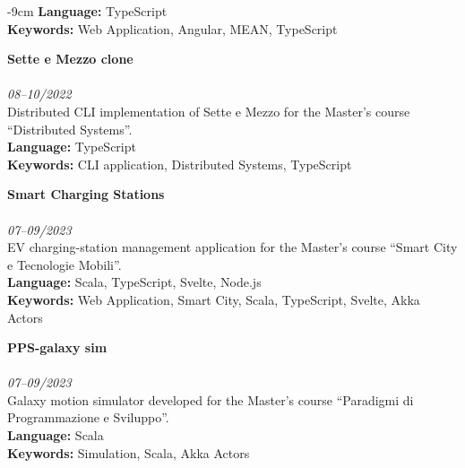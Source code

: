 \documentclass[10pt,a4paper]{altacv}
\begin{document}
\begin{adjustwidth}{}{-9cm}
    \textbf{Language:} TypeScript\\
    \textbf{Keywords:} Web Application, Angular, MEAN, TypeScript

    \divider

    \textcolor{accent}{\textbf{Sette e Mezzo clone}}\\
    \\
    \textit{08--10/2022}\\ \smallskip
    Distributed CLI implementation of Sette e Mezzo for the Master's course ``Distributed Systems''.\\ \smallskip
    \textbf{Language:} TypeScript\\
    \textbf{Keywords:} CLI application, Distributed Systems, TypeScript

    \divider

    \textcolor{accent}{\textbf{Smart Charging Stations}}\\
    \\
    \textit{07--09/2023} \\ \smallskip
    EV charging-station management application for the Master's course ``Smart City e Tecnologie Mobili''.\\ \smallskip
    \textbf{Language:} Scala, TypeScript, Svelte, Node.js\\
    \textbf{Keywords:} Web Application, Smart City, Scala, TypeScript, Svelte, Akka Actors

    \divider

    \textcolor{accent}{\textbf{PPS-galaxy sim}}\\
    \\
    \textit{07--09/2023} \\ \smallskip
    Galaxy motion simulator developed for the Master's course ``Paradigmi di Programmazione e Sviluppo''.\\ \smallskip
    \textbf{Language:} Scala\\
    \textbf{Keywords:} Simulation, Scala, Akka Actors

\end{adjustwidth}
\end{document}
